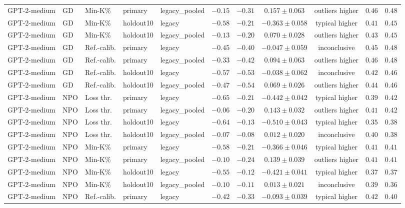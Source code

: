 \begin{table}[t]
\begin{tabular*}{\textwidth}{@{\extracolsep{\fill}}lllllcccccc@{}}
GPT-2-medium & GD & Min-K\% & primary & legacy\_pooled & $-0.15$ & $-0.31$ & $0.157 \pm 0.063$ & outliers higher & $0.46$ & $0.48$ \\
GPT-2-medium & GD & Min-K\% & holdout10 & legacy & $-0.58$ & $-0.21$ & $-0.363 \pm 0.058$ & typical higher & $0.41$ & $0.45$ \\
GPT-2-medium & GD & Min-K\% & holdout10 & legacy\_pooled & $-0.13$ & $-0.20$ & $0.070 \pm 0.028$ & outliers higher & $0.43$ & $0.45$ \\
GPT-2-medium & GD & Ref.-calib. & primary & legacy & $-0.45$ & $-0.40$ & $-0.047 \pm 0.059$ & inconclusive & $0.45$ & $0.48$ \\
GPT-2-medium & GD & Ref.-calib. & primary & legacy\_pooled & $-0.33$ & $-0.42$ & $0.094 \pm 0.063$ & outliers higher & $0.46$ & $0.48$ \\
GPT-2-medium & GD & Ref.-calib. & holdout10 & legacy & $-0.57$ & $-0.53$ & $-0.038 \pm 0.062$ & inconclusive & $0.42$ & $0.46$ \\
GPT-2-medium & GD & Ref.-calib. & holdout10 & legacy\_pooled & $-0.47$ & $-0.54$ & $0.069 \pm 0.026$ & outliers higher & $0.44$ & $0.46$ \\
GPT-2-medium & NPO & Loss thr. & primary & legacy & $-0.65$ & $-0.21$ & $-0.442 \pm 0.042$ & typical higher & $0.39$ & $0.42$ \\
GPT-2-medium & NPO & Loss thr. & primary & legacy\_pooled & $-0.06$ & $-0.20$ & $0.143 \pm 0.032$ & outliers higher & $0.41$ & $0.42$ \\
GPT-2-medium & NPO & Loss thr. & holdout10 & legacy & $-0.64$ & $-0.13$ & $-0.510 \pm 0.043$ & typical higher & $0.35$ & $0.38$ \\
GPT-2-medium & NPO & Loss thr. & holdout10 & legacy\_pooled & $-0.07$ & $-0.08$ & $0.012 \pm 0.020$ & inconclusive & $0.40$ & $0.38$ \\
GPT-2-medium & NPO & Min-K\% & primary & legacy & $-0.58$ & $-0.21$ & $-0.366 \pm 0.046$ & typical higher & $0.41$ & $0.41$ \\
GPT-2-medium & NPO & Min-K\% & primary & legacy\_pooled & $-0.10$ & $-0.24$ & $0.139 \pm 0.039$ & outliers higher & $0.41$ & $0.41$ \\
GPT-2-medium & NPO & Min-K\% & holdout10 & legacy & $-0.55$ & $-0.12$ & $-0.421 \pm 0.041$ & typical higher & $0.37$ & $0.37$ \\
GPT-2-medium & NPO & Min-K\% & holdout10 & legacy\_pooled & $-0.10$ & $-0.11$ & $0.013 \pm 0.021$ & inconclusive & $0.39$ & $0.36$ \\
GPT-2-medium & NPO & Ref.-calib. & primary & legacy & $-0.42$ & $-0.33$ & $-0.093 \pm 0.039$ & typical higher & $0.42$ & $0.40$ \\

\end{tabular*}
\end{table}
